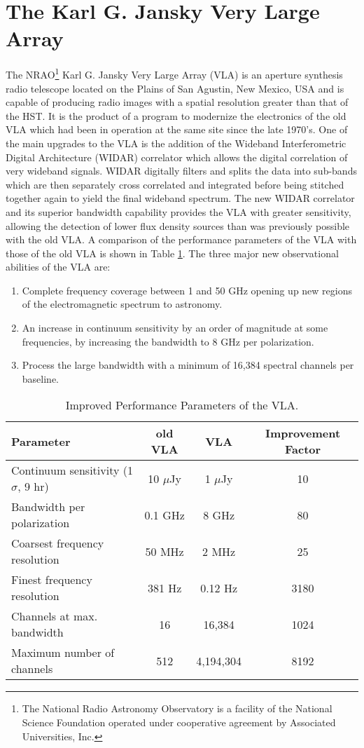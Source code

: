 \section{The Karl G. Jansky Very Large Array}\label{sec:3.5}
The NRAO\footnote{The National Radio Astronomy Observatory is a facility of the National Science Foundation operated under cooperative agreement by Associated Universities, Inc.} Karl G. Jansky Very Large Array (VLA) is an aperture synthesis radio telescope located on the Plains of San Agustin, New Mexico, USA and is capable of producing radio images with a spatial resolution greater than that of the HST. It is the product of a program to modernize the electronics of the old VLA which had been in operation at the same site since the late 1970's. One of the main upgrades to the VLA is the addition of the Wideband Interferometric Digital Architecture (WIDAR) correlator which allows the digital correlation of very wideband signals. WIDAR digitally filters and splits the data into sub-bands which are then separately cross correlated and integrated before being stitched together again to yield the final wideband spectrum. The new WIDAR correlator and its superior bandwidth capability provides the VLA with greater sensitivity, allowing the detection of lower flux density sources than was previously possible with the old VLA. A comparison of the performance parameters of the VLA with those of the old VLA is shown in Table \ref{tab:3.5}. The three major new observational abilities of the VLA are:
\begin{enumerate}
\item Complete frequency coverage between 1 and 50 GHz opening up new regions of the electromagnetic spectrum to astronomy.
\item An increase in continuum sensitivity by an order of magnitude at some frequencies, by increasing the bandwidth to 8 GHz per polarization.
\item Process the large bandwidth with a minimum of 16,384 spectral channels per baseline.
\end{enumerate}

\begin{table}
\begin{center}
\caption[Improved Performance Parameters of the VLA.]
{Improved Performance Parameters of the VLA.}
\begin{tabular}{lccc}
\hline
\hline
\rule{0pt}{2.5ex}Parameter & old VLA & VLA & Improvement Factor \\
\hline
\rule{0pt}{2.5ex}Continuum sensitivity (1$\sigma$, 9 hr) & 10 $\mu$Jy & 1 $\mu$Jy& 10\\
Bandwidth per polarization & 0.1 GHz & 8 GHz & 80\\ 
Coarsest frequency resolution & 50 MHz & 2 MHz & 25\\ 
Finest frequency resolution & 381 Hz & 0.12 Hz & 3180\\ 
Channels at max. bandwidth & 16 & 16,384 & 1024\\ 
Maximum number of channels & 512 & 4,194,304 & 8192\\ 
\hline
\end{tabular}
\label{tab:3.5}
\end{center}
\end{table}

